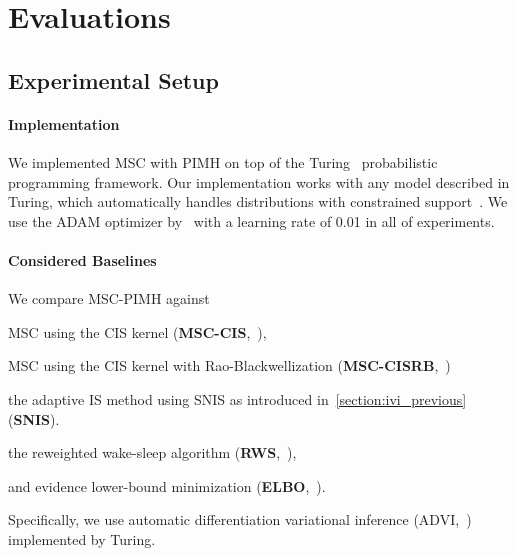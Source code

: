\section{Evaluations}\label{section:eval}
\subsection{Experimental Setup}
\paragraph{Implementation}
We implemented MSC with PIMH on top of the Turing~\citep{ge2018t} probabilistic programming framework.
Our implementation works with any model described in Turing, which automatically handles distributions with constrained support~\citep{JMLR:v18:16-107}.
We use the ADAM optimizer by~\citet{kingma_adam_2017} with a learning rate of 0.01 in all of experiments.

\vspace{-0.1in}
\paragraph{Considered Baselines}
We compare MSC-PIMH against
\begin{enumerate*}[label=\textbf{(\roman*)}]
  \item  MSC using the CIS kernel (\textbf{MSC-CIS},~\citealt{NEURIPS2020_b2070693}), 
  \item  MSC using the CIS kernel with Rao-Blackwellization (\textbf{MSC-CISRB},~\citealt{NEURIPS2020_b2070693})
  \item the adaptive IS method using SNIS as introduced in~\cref{section:ivi_previous} (\textbf{SNIS}).
  \item the reweighted wake-sleep algorithm (\textbf{RWS},~\citealt{DBLP:journals/corr/BornscheinB14}),  
  \item and evidence lower-bound minimization (\textbf{ELBO},~\citealt{pmlr-v33-ranganath14}).
\end{enumerate*}
Specifically, we use automatic differentiation variational inference (ADVI,~\citealt{JMLR:v18:16-107}) implemented by Turing.

